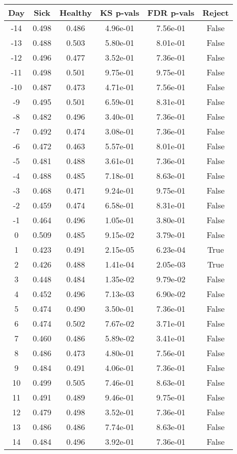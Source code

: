 \begin{tabular}{c|c|c|c|c|c}
Day &  Sick & Healthy &  KS p-vals & FDR p-vals & Reject\\
\hline
-14 & 0.498 &   0.486 &   4.96e-01 &   7.56e-01 &  False\\
-13 & 0.488 &   0.503 &   5.80e-01 &   8.01e-01 &  False\\
-12 & 0.496 &   0.477 &   3.52e-01 &   7.36e-01 &  False\\
-11 & 0.498 &   0.501 &   9.75e-01 &   9.75e-01 &  False\\
-10 & 0.487 &   0.473 &   4.71e-01 &   7.56e-01 &  False\\
 -9 & 0.495 &   0.501 &   6.59e-01 &   8.31e-01 &  False\\
 -8 & 0.482 &   0.496 &   3.40e-01 &   7.36e-01 &  False\\
 -7 & 0.492 &   0.474 &   3.08e-01 &   7.36e-01 &  False\\
 -6 & 0.472 &   0.463 &   5.57e-01 &   8.01e-01 &  False\\
 -5 & 0.481 &   0.488 &   3.61e-01 &   7.36e-01 &  False\\
 -4 & 0.488 &   0.485 &   7.18e-01 &   8.63e-01 &  False\\
 -3 & 0.468 &   0.471 &   9.24e-01 &   9.75e-01 &  False\\
 -2 & 0.459 &   0.474 &   6.58e-01 &   8.31e-01 &  False\\
 -1 & 0.464 &   0.496 &   1.05e-01 &   3.80e-01 &  False\\
  0 & 0.509 &   0.485 &   9.15e-02 &   3.79e-01 &  False\\
  1 & 0.423 &   0.491 &   2.15e-05 &   6.23e-04 &   True\\
  2 & 0.426 &   0.488 &   1.41e-04 &   2.05e-03 &   True\\
  3 & 0.448 &   0.484 &   1.35e-02 &   9.79e-02 &  False\\
  4 & 0.452 &   0.496 &   7.13e-03 &   6.90e-02 &  False\\
  5 & 0.474 &   0.490 &   3.50e-01 &   7.36e-01 &  False\\
  6 & 0.474 &   0.502 &   7.67e-02 &   3.71e-01 &  False\\
  7 & 0.460 &   0.486 &   5.89e-02 &   3.41e-01 &  False\\
  8 & 0.486 &   0.473 &   4.80e-01 &   7.56e-01 &  False\\
  9 & 0.484 &   0.491 &   4.06e-01 &   7.36e-01 &  False\\
 10 & 0.499 &   0.505 &   7.46e-01 &   8.63e-01 &  False\\
 11 & 0.491 &   0.489 &   9.46e-01 &   9.75e-01 &  False\\
 12 & 0.479 &   0.498 &   3.52e-01 &   7.36e-01 &  False\\
 13 & 0.486 &   0.486 &   7.74e-01 &   8.63e-01 &  False\\
 14 & 0.484 &   0.496 &   3.92e-01 &   7.36e-01 &  False\\
\end{tabular}